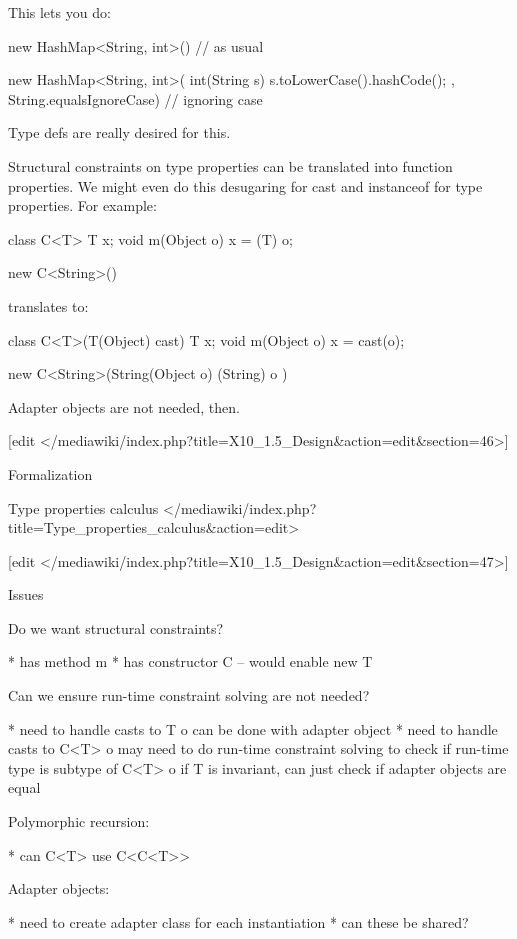 This lets you do:

   new HashMap<String, int>()  // as usual

   new HashMap<String, int>(
       int(String s) { s.toLowerCase().hashCode(); },
       String.equalsIgnoreCase)   // ignoring case

Type defs are really desired for this.

Structural constraints on type properties can be translated into
function properties. We might even do this desugaring for cast and
instanceof for type properties. For example:

   class C<T> {
       T x;
       void m(Object o) { x = (T) o; }
   }

   new C<String>()

translates to:

   class C<T>(T(Object) cast) {
       T x;
       void m(Object o) { x = cast(o); }
   }

   new C<String>(String(Object o) { (String) o })

Adapter objects are not needed, then.


[edit </mediawiki/index.php?title=X10_1.5_Design&action=edit&section=46>]


    Formalization

Type properties calculus
</mediawiki/index.php?title=Type_properties_calculus&action=edit>

[edit </mediawiki/index.php?title=X10_1.5_Design&action=edit&section=47>]


    Issues

Do we want structural constraints?

    * has method m
    * has constructor C -- would enable new T 

Can we ensure run-time constraint solving are not needed?

    * need to handle casts to T
          o can be done with adapter object 
    * need to handle casts to C<T>
          o may need to do run-time constraint solving to check if
            run-time type is subtype of C<T>
          o if T is invariant, can just check if adapter objects are equal 

Polymorphic recursion:

    * can C<T> use C<C<T>> 

Adapter objects:

    * need to create adapter class for each instantiation
    * can these be shared? 

